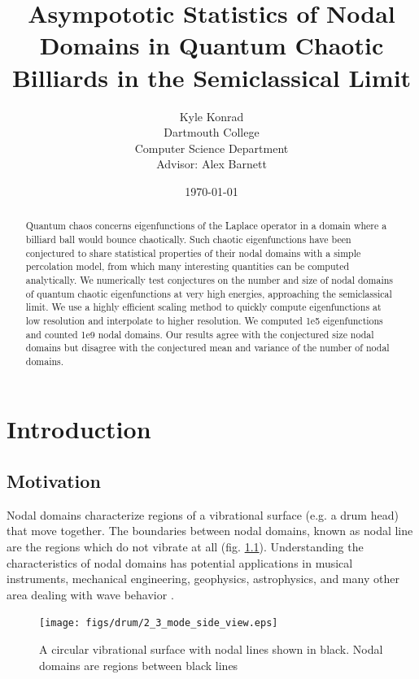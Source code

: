 \documentclass{report}
\begin{document}
\title{Asympototic Statistics of Nodal Domains in Quantum Chaotic Billiards in the Semiclassical Limit}
\author{Kyle Konrad\\
  Dartmouth College\\
  Computer Science Department\\
  Advisor: Alex Barnett}
\date{\today}

\maketitle

\begin{abstract}
  Quantum chaos concerns eigenfunctions of the Laplace operator in a domain where a billiard ball would bounce chaotically.
Such chaotic eigenfunctions have been conjectured to share statistical properties of their nodal domains with a simple percolation model, from which many interesting quantities can be computed analytically. We numerically test conjectures on the number and size of nodal domains of quantum chaotic eigenfunctions at very high energies, approaching the semiclassical limit. We use a highly efficient scaling method to quickly compute eigenfunctions at low resolution and interpolate to higher resolution. We computed 1e{5} eigenfunctions and counted 1e{9} nodal domains. Our results agree with the conjectured size nodal domains but disagree with the conjectured mean and variance of the number of nodal domains.
\end{abstract}

\chapter{Introduction}
\label{chap:intro}
\section{Motivation}
\label{sec:motivation}
Nodal domains characterize regions of a vibrational surface (e.g. a drum head) that move together. The boundaries between nodal domains, known as nodal line are the regions which do not vibrate at all (fig. \ref{fig:drum}). Understanding the characteristics of nodal domains has potential applications in musical instruments, mechanical engineering, geophysics, astrophysics, and many other area dealing with wave behavior \cite{wigman}.

\begin{figure}
  \begin{center}
    \texttt{[image: figs/drum/2\_3\_mode\_side\_view.eps]}
    \caption{A circular vibrational surface with nodal lines shown in black. Nodal domains are regions between black lines}
    \label{fig:drum}
  \end{center}
\end{figure}
\end{document}
